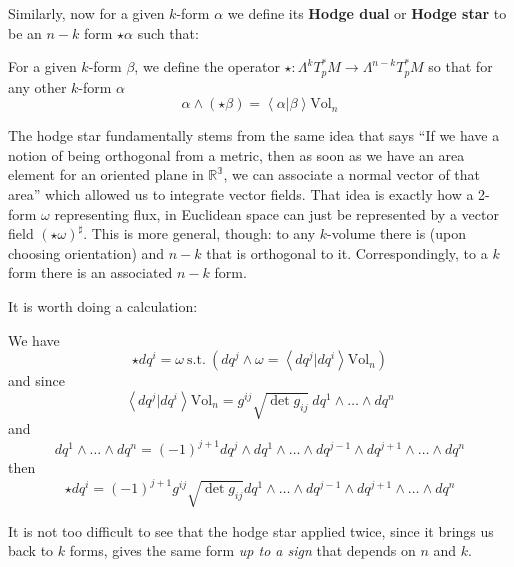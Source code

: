 \documentclass[../master.tex]{subfiles}
\begin{document}
	Similarly, now for a given $k$-form $\alpha$ we define its \textbf{Hodge dual} or \textbf{Hodge star} to be an $n-k$ form $\star \alpha$ such that:
	\begin{defn}
		For a given $k$-form $\beta$, we define the operator $\star: \Lambda^k T_p^*M \rightarrow \Lambda^{n-k} T_p^*M$ so that for any other $k$-form $\alpha$
		\begin{equation}
			\alpha \wedge (\star \beta) = \left< \alpha | \beta \right> \mathrm{Vol}_n
		\end{equation}
	\end{defn}
	
	The hodge star fundamentally stems from the same idea that says ``If we have a notion of being orthogonal from a metric, then as soon as we have an area element for an oriented plane in $\mathbb{R^3}$, we can associate a normal vector of that area'' which allowed us to integrate vector fields. That idea is exactly how a 2-form $\omega$ representing flux, in Euclidean space can just be represented by a vector field $(\star \omega)^\sharp$. This is more general, though: to any $k$-volume there is (upon choosing orientation) and $n-k$ that is orthogonal to it. Correspondingly, to a $k$ form there is an associated $n-k$ form. 
	
	It is worth doing a calculation:
	\begin{obs}
		We have
		\begin{equation}
			\star dq^i = \omega~\mathrm{ s.t. }~ (dq^j \wedge \omega = \left<dq^j |  dq^i \right> \mathrm{Vol}_n )
		\end{equation}
		and since
		\begin{equation}
			\left<dq^j |  dq^i \right> \mathrm{Vol}_n  = g^{ij} \sqrt{\det g_{ij}} ~ dq^1 \wedge \dots \wedge dq^n
		\end{equation}
		and
		\begin{equation}
			dq^1 \wedge \dots \wedge dq^n = (-1)^{j+1} dq^j \wedge dq^1 \wedge \dots \wedge dq^{j-1} \wedge dq^{j+1} \wedge \dots \wedge dq^n
		\end{equation}
		then
		\begin{equation}
			\star dq^i = (-1)^{j+1} g^{ij} \sqrt{\det g_{ij}} dq^1 \wedge \dots \wedge dq^{j-1} \wedge dq^{j+1} \wedge \dots \wedge dq^n
		\end{equation}
	\end{obs}
	 
	 It is not too difficult to see that the hodge star applied twice, since it brings us back to $k$ forms, gives the same form \emph{up to a sign} that depends on $n$ and $k$. 
	 
\end{document}
